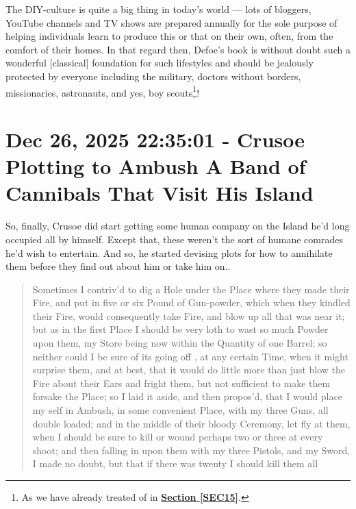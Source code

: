 \documentclass[a4paper]{article}
\begin{document}
The DIY-culture is quite a big thing in today's world --- lots of bloggers, YouTube channels and TV shows are prepared annually for the sole purpose of helping individuals learn to produce this or that on their own, often, from the comfort of their homes. In that regard then, Defoe's book is without doubt such a wonderful [classical] foundation for such lifestyles and should be jealously protected by everyone including the military, doctors without borders, missionaries, astronauts, and yes, boy scouts\footnote{As we have already treated of in \textbf{\hyperref[SEC15]{Section \ref{SEC15}}}.}!




\section{Dec 26, 2025 22:35:01 - Crusoe Plotting to Ambush A Band of Cannibals That Visit His Island}
\label{SEC45}


So, finally, Crusoe did start getting some human company on the Island he'd long occupied all by himself. Except that, these weren't the sort of humane comrades he'd wish to entertain. And so, he started devising plots for how to annihilate them before they find out about him or take him on..


\noindent
\begin{minipage}{1\textwidth}
\vspace{1em}
\begin{quotation}
{\ttfamily


Sometimes I contriv’d to dig a Hole under the Place where they made their Fire, and put in five or six Pound of Gun-powder, which when they kindled their Fire, would consequently take Fire, and blow up all that was near it; but as in the first Place I should be very loth to wast so much Powder upon them, my Store being now within the Quantity of one Barrel; so neither could I be sure of its going off , at any certain Time, when it might surprise them, and at best, that it would do little more than just blow the Fire about their Ears and fright them, but not sufficient to make them forsake the Place; so I laid it aside, and then propos’d, that I would place my self in Ambush, in some convenient Place, with my three Guns, all double loaded; and in the middle of their bloody Ceremony, let fly at them, when I should be sure to kill or wound perhaps two or three at every shoot; and then falling in upon them with my three Pistols, and my Sword, I made no doubt, but that if there was twenty I should kill them all


}
\end{quotation}
\vspace{1em}
\end{minipage}
\end{document}
